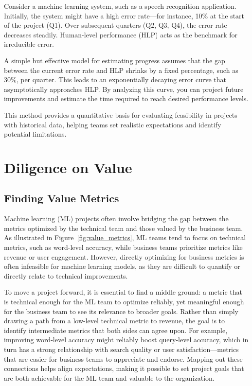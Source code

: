 \documentclass[12pt,openany]{book}
\begin{document}
Consider a machine learning system, such as a speech recognition application. Initially, the system might have a high error rate—for instance, 10\% at the start of the project (Q1). Over subsequent quarters (Q2, Q3, Q4), the error rate decreases steadily. Human-level performance (HLP) acts as the benchmark for irreducible error. \newline

A simple but effective model for estimating progress assumes that the gap between the current error rate and HLP shrinks by a fixed percentage, such as 30\%, per quarter. This leads to an exponentially decaying error curve that asymptotically approaches HLP. By analyzing this curve, you can project future improvements and estimate the time required to reach desired performance levels. \newline

This method provides a quantitative basis for evaluating feasibility in projects with historical data, helping teams set realistic expectations and identify potential limitations. \newline



\section{Diligence on Value}


\subsection{Finding Value Metrics}

Machine learning (ML) projects often involve bridging the gap between the metrics optimized by the technical team and those valued by the business team. As illustrated in Figure~\ref{fig:value_metrics}, ML teams tend to focus on technical metrics, such as word-level accuracy, while business teams prioritize metrics like revenue or user engagement. However, directly optimizing for business metrics is often infeasible for machine learning models, as they are difficult to quantify or directly relate to technical improvements. \newline

To move a project forward, it is essential to find a middle ground: a metric that is technical enough for the ML team to optimize reliably, yet meaningful enough for the business team to see its relevance to broader goals. Rather than simply drawing a path from a low-level technical metric to revenue, the goal is to identify intermediate metrics that both sides can agree upon. For example, improving word-level accuracy might reliably boost query-level accuracy, which in turn has a strong relationship with search quality or user satisfaction—metrics that are easier for business teams to appreciate and endorse. Mapping out these connections helps align expectations, making it possible to set project goals that are both achievable for the ML team and valuable to the organization. \newline
\end{document}
